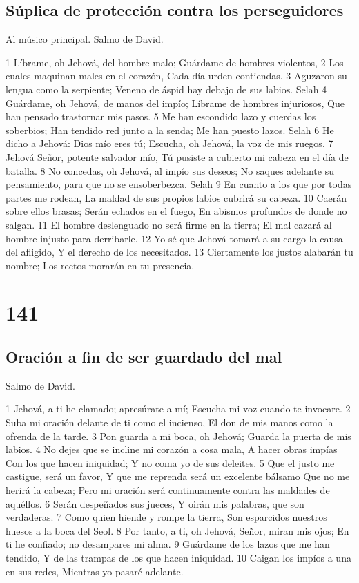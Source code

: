 \section*{Súplica de protección contra los perseguidores}

Al músico principal. Salmo de David.

1 Líbrame, oh Jehová, del hombre malo;
Guárdame de hombres violentos,
2 Los cuales maquinan males en el corazón,
Cada día urden contiendas.
3 Aguzaron su lengua como la serpiente;
Veneno de áspid hay debajo de sus labios. Selah
4 Guárdame, oh Jehová, de manos del impío;
Líbrame de hombres injuriosos,
Que han pensado trastornar mis pasos.
5 Me han escondido lazo y cuerdas los soberbios;
Han tendido red junto a la senda;
Me han puesto lazos. Selah
6 He dicho a Jehová: Dios mío eres tú;
Escucha, oh Jehová, la voz de mis ruegos.
7 Jehová Señor, potente salvador mío,
Tú pusiste a cubierto mi cabeza en el día de batalla.
8 No concedas, oh Jehová, al impío sus deseos;
No saques adelante su pensamiento, para que no se ensoberbezca. Selah
9 En cuanto a los que por todas partes me rodean,
La maldad de sus propios labios cubrirá su cabeza.
10 Caerán sobre ellos brasas;
Serán echados en el fuego,
En abismos profundos de donde no salgan.
11 El hombre deslenguado no será firme en la tierra;
El mal cazará al hombre injusto para derribarle.
12 Yo sé que Jehová tomará a su cargo la causa del afligido,
Y el derecho de los necesitados.
13 Ciertamente los justos alabarán tu nombre;
Los rectos morarán en tu presencia.

\chapter{141}

\section*{Oración a fin de ser guardado del mal}

Salmo de David.

1 Jehová, a ti he clamado; apresúrate a mí;
Escucha mi voz cuando te invocare.
2 Suba mi oración delante de ti como el incienso,
El don de mis manos como la ofrenda de la tarde.
3 Pon guarda a mi boca, oh Jehová;
Guarda la puerta de mis labios.
4 No dejes que se incline mi corazón a cosa mala,
A hacer obras impías
Con los que hacen iniquidad;
Y no coma yo de sus deleites.
5 Que el justo me castigue, será un favor,
Y que me reprenda será un excelente bálsamo
Que no me herirá la cabeza;
Pero mi oración será continuamente contra las maldades de aquéllos.
6 Serán despeñados sus jueces,
Y oirán mis palabras, que son verdaderas.
7 Como quien hiende y rompe la tierra,
Son esparcidos nuestros huesos a la boca del Seol.
8 Por tanto, a ti, oh Jehová, Señor, miran mis ojos;
En ti he confiado; no desampares mi alma.
9 Guárdame de los lazos que me han tendido,
Y de las trampas de los que hacen iniquidad.
10 Caigan los impíos a una en sus redes,
Mientras yo pasaré adelante.

